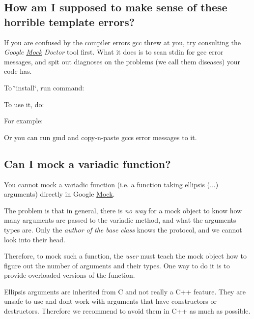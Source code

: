 \subsection*{How am I supposed to make sense of these horrible template errors?}

If you are confused by the compiler errors gcc threw at you, try consulting the {\itshape Google \mbox{\hyperlink{class_mock}{Mock}} Doctor} tool first. What it does is to scan stdin for gcc error messages, and spit out diagnoses on the problems (we call them diseases) your code has.

To \char`\"{}install\char`\"{}, run command\+: 
\begin{DoxyCode}{0}
\end{DoxyCode}


To use it, do\+: 
\begin{DoxyCode}{0}
\end{DoxyCode}


For example\+: 
\begin{DoxyCode}{0}
\end{DoxyCode}


Or you can run {\ttfamily gmd} and copy-\/n-\/paste gcc\textquotesingle{}s error messages to it.

\subsection*{Can I mock a variadic function?}

You cannot mock a variadic function (i.\+e. a function taking ellipsis ({\ttfamily ...}) arguments) directly in Google \mbox{\hyperlink{class_mock}{Mock}}.

The problem is that in general, there is {\itshape no way} for a mock object to know how many arguments are passed to the variadic method, and what the arguments\textquotesingle{} types are. Only the {\itshape author of the base class} knows the protocol, and we cannot look into their head.

Therefore, to mock such a function, the {\itshape user} must teach the mock object how to figure out the number of arguments and their types. One way to do it is to provide overloaded versions of the function.

Ellipsis arguments are inherited from C and not really a C++ feature. They are unsafe to use and don\textquotesingle{}t work with arguments that have constructors or destructors. Therefore we recommend to avoid them in C++ as much as possible.


